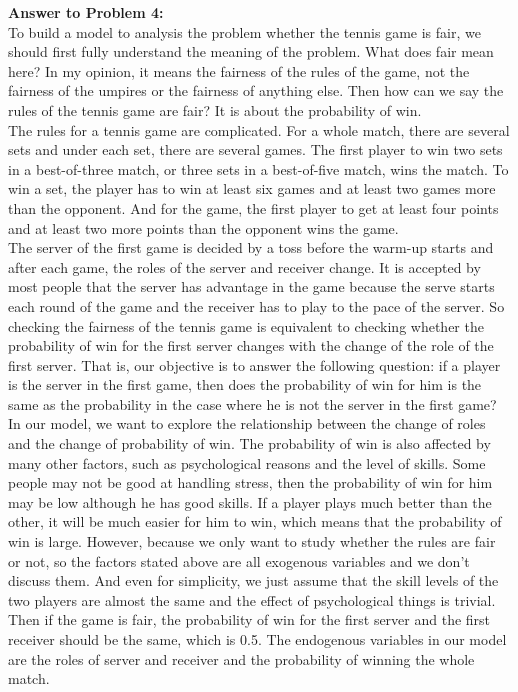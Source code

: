 \documentclass[12pt]{article}
\begin{document}
\newpage
\noindent\textbf{Answer to Problem 4:}\\

To build a model to analysis the problem whether the tennis game is fair, we should first fully understand the meaning of the problem. What does fair mean here? In my opinion, it means the fairness of the rules of the game, not the fairness of the umpires or the fairness of anything else. Then how can we say the rules of the tennis game are fair? It is about the probability of win.\\

The rules for a tennis game are complicated. For a whole match, there are several sets and under each set, there are several games. The first player to win two sets in a best-of-three match, or three sets in a best-of-five match, wins the match. To win a set, the player has to win at least six games and at least two games more than the opponent. And for the game, the first player to get at least four points and at least two more points than the opponent wins the game.\\

The server of the first game is decided by a toss before the warm-up starts and after each game, the roles of the server and receiver change. It is accepted by most people that the server has advantage in the game because the serve starts each round of the game and the receiver has to play to the pace of the server. So checking the fairness of the tennis game is equivalent to checking whether the probability of win for the first server changes with the change of the role of the first server. That is, our objective is to answer the following question: if a player is the server in the first game, then does the probability of win for him is the same as the probability in the case where he is not the server in the first game?\\

In our model, we want to explore the relationship between the change of roles and the change of probability of win. The probability of win is also affected by many other factors, such as psychological reasons and the level of skills. Some people may not be good at handling stress, then the probability of win for him may be low although he has good skills. If a player plays much better than the other, it will be much easier for him to win, which means that the probability of win is large. However, because we only want to study whether the rules are fair or not, so the factors stated above are all exogenous variables and we don't discuss them. And even for simplicity, we just assume that the skill levels of the two players are almost the same and the effect of psychological things is trivial. Then if the game is fair, the probability of win for the first server and the first receiver should be the same, which is 0.5. The endogenous variables in our model are the roles of server and receiver and the probability of winning the whole match.\\
\end{document}
